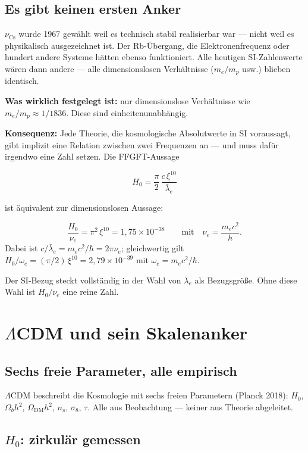 \section{Es gibt keinen ersten Anker}

$\nu_\text{Cs}$ wurde 1967 gewählt weil es technisch stabil
realisierbar war — nicht weil es physikalisch ausgezeichnet ist.
Der Rb-Übergang, die Elektronenfrequenz oder hundert andere Systeme
hätten ebenso funktioniert. Alle heutigen SI-Zahlenwerte wären dann
andere — alle dimensionslosen Verhältnisse ($m_e/m_p$ usw.) blieben
identisch.

\textbf{Was wirklich festgelegt ist:} nur dimensionslose Verhältnisse
wie $m_e/m_p \approx 1/1836$. Diese sind einheitenunabhängig.

\textbf{Konsequenz:} Jede Theorie, die kosmologische Absolutwerte in SI
voraussagt, gibt implizit eine Relation zwischen zwei Frequenzen an —
und muss dafür irgendwo eine Zahl setzen. Die FFGFT-Aussage

\[
  H_0 = \frac{\pi}{2}\,\frac{c\,\xi^{10}}{\bar\lambda_e}
\]

ist äquivalent zur dimensionslosen Aussage:

\[
  \frac{H_0}{\nu_e} = \pi^2\,\xi^{10} = 1{,}75\times10^{-38}
  \qquad\text{mit}\quad \nu_e = \frac{m_e c^2}{h}.
\]
Dabei ist $c/\bar\lambda_e = m_ec^2/\hbar = 2\pi\nu_e$; gleichwertig gilt
$H_0/\omega_e = (\pi/2)\,\xi^{10} = 2{,}79\times10^{-39}$ mit $\omega_e = m_ec^2/\hbar$.

Der SI-Bezug steckt vollständig in der Wahl von $\bar\lambda_e$ als
Bezugsgröße. Ohne diese Wahl ist $H_0/\nu_e$ eine reine Zahl.

\chapter{$\Lambda$CDM und sein Skalenanker}

\section{Sechs freie Parameter, alle empirisch}

$\Lambda$CDM beschreibt die Kosmologie mit sechs freien Parametern
(Planck 2018): $H_0$, $\Omega_b h^2$, $\Omega_\text{DM} h^2$, $n_s$,
$\sigma_8$, $\tau$. Alle aus Beobachtung — keiner aus Theorie abgeleitet.

\section{$H_0$: zirkulär gemessen}

